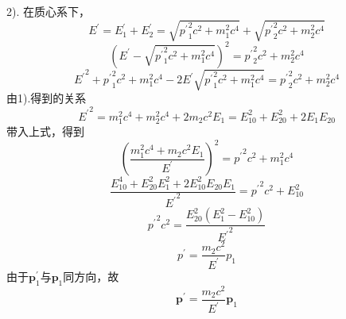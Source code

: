 \documentclass[11pt,a4paper]{article}
\renewcommand{\vec}[1]{\boldsymbol{#1}}
\begin{document}
2). 在质心系下，
\begin{equation*}
E^{\prime} = E^{\prime}_1 +E^{\prime}_2 = \sqrt{{p^{\prime}}^2_1 c^2 +m_1^2 c^4} +\sqrt{{p^{\prime}}^2_2 c^2 +m_2^2 c^4}
\end{equation*}
\begin{equation*}
(E^{\prime} -\sqrt{{p^{\prime}}^2_1 c^2 +m_1^2 c^4})^2  = {p^{\prime}}^2_2 c^2 +m_2^2 c^4
\end{equation*}
\begin{equation*}
{E^{\prime}}^2 + {p^{\prime}}^2_1 c^2 +m_1^2 c^4 - 2 E^{\prime} \sqrt{{p^{\prime}}^2_1 c^2 +m_1^2 c^4} = {p^{\prime}}^2_2 c^2 +m_2^2 c^4
\end{equation*}
由1).得到的关系
\begin{equation*}
{E^{\prime}}^2 = m_1^2 c^4 + m_2^2 c^4 +2m_2 c^2 E_1 = E_{10}^2 +E_{20}^2 +2E_1 E_{20}
\end{equation*}
带入上式，得到
\begin{equation*}
\left(\frac{m_1^2 c^4 + m_2 c^2 E_1}{E^{\prime}} \right)^2 = {p^{\prime}}^2 c^2 +m_1^2 c^4
\end{equation*}
\begin{equation*}
\frac{E_{10}^4 +E_{20}^2 E_1^2 +2E_{10}^2 E_{20} E_1}{{E^{\prime}}^2} = {p^{\prime}}^2 c^2 +E_{10}^2
\end{equation*}
\begin{equation*}
{p^{\prime}}^2c^2 = \frac{E_{20}^2 (E_1^2 -E_{10}^2)}{{E^{\prime}}^2}
\end{equation*}
\begin{equation*}
p^{\prime} = \frac{m_2 c^2}{E^{\prime}} p_1
\end{equation*}
由于$\vec{p}^{\prime}_1$与$\vec{p}_1$同方向，故
\begin{equation*}
\vec{p}^{\prime} = \frac{m_2 c^2}{E^{\prime}} \vec{p}_1
\end{equation*}
\end{document}
